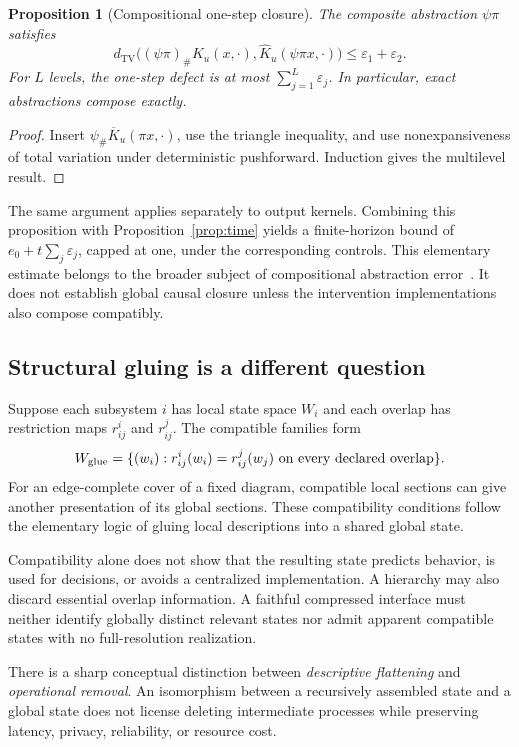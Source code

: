 \documentclass[11pt,letterpaper]{article}
\theoremstyle{plain}
\newtheorem{proposition}{Proposition}[section]
\theoremstyle{definition}
\theoremstyle{remark}
\newcommand{\TV}{d_{\mathrm{TV}}}
\begin{document}
\begin{proposition}[Compositional one-step closure]\label{prop:composition}
The composite abstraction $\psi\pi$ satisfies
\[
\TV\bigl((\psi\pi)_{\#}K_u(x,\cdot),
\widehat K_u(\psi\pi x,\cdot)\bigr)
\leq\varepsilon_1+\varepsilon_2.
\]
For $L$ levels, the one-step defect is at most $\sum_{j=1}^L\varepsilon_j$. In particular, exact abstractions compose exactly.
\end{proposition}
\begin{proof}
Insert $\psi_{\#}\overline K_u(\pi x,\cdot)$, use the triangle inequality, and use nonexpansiveness of total variation under deterministic pushforward. Induction gives the multilevel result.
\end{proof}

The same argument applies separately to output kernels. Combining this proposition with Proposition~\ref{prop:time} yields a finite-horizon bound of $e_0+t\sum_j\varepsilon_j$, capped at one, under the corresponding controls. This elementary estimate belongs to the broader subject of compositional abstraction error~\cite{rischel}. It does not establish global causal closure unless the intervention implementations also compose compatibly.

\subsection{Structural gluing is a different question}
Suppose each subsystem $i$ has local state space $W_i$ and each overlap has restriction maps $r_{ij}^i$ and $r_{ij}^j$. The compatible families form
\[
W_{\rm glue}=\{(w_i):r_{ij}^i(w_i)=r_{ij}^j(w_j)\text{ on every declared overlap}\}.
\]
For an edge-complete cover of a fixed diagram, compatible local sections can give another presentation of its global sections. These compatibility conditions follow the elementary logic of gluing local descriptions into a shared global state.

Compatibility alone does not show that the resulting state predicts behavior, is used for decisions, or avoids a centralized implementation. A hierarchy may also discard essential overlap information. A faithful compressed interface must neither identify globally distinct relevant states nor admit apparent compatible states with no full-resolution realization.

There is a sharp conceptual distinction between \emph{descriptive flattening} and \emph{operational removal}. An isomorphism between a recursively assembled state and a global state does not license deleting intermediate processes while preserving latency, privacy, reliability, or resource cost.
\end{document}
